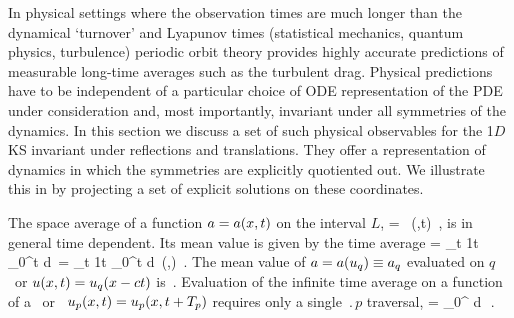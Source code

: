 


In physical settings where the observation times are much longer
than the dynamical `turnover' and Lyapunov times (statistical mechanics,
quantum physics, turbulence)
periodic orbit theory
provides highly accurate predictions of measurable
long-time averages such as the turbulent drag.
Physical predictions have to be independent of a
particular choice of ODE representation of
the PDE under consideration
and, most importantly,
invariant under all symmetries of the dynamics.
In this section we discuss
a set of such physical observables for
the  1$D$ KS invariant under reflections and translations.
They offer a representation of
dynamics in which the symmetries are explicitly quotiented out.
We illustrate  this in   by projecting
a set of explicit solutions on these coordinates.

The {space average} of a function $a = a(x,t)$  on
the interval $L$,
\beq
    \expct{\obser} = \Lint{\pSpace}\, \obser(\pSpace,t)
    \,,
    \label{rpo:spac_ave}
\eeq
is in general time dependent.
Its mean value is given by the {time average}
\beq
\timeAver{\obser}
    =
\lim_{t\rightarrow \infty} {1\over t} \int_0^t \! d\tau \, \expct{\obser}
    =
\lim_{t\rightarrow \infty} {1\over t} \int_0^t \!
    \Lint{\tau}  d\pSpace\, \obser(\pSpace,\tau)
    \,.
\label{rpo:tim_ave}
\eeq
The mean value
of $a = a(u_q) \equiv a_q$ evaluated on
$q$ \eqv\ or {\reqv} $u(x,t) = u_q(x-ct)$ is
\beq
\RLDedit{\timeAver{\obser}_\stagn = \expct{\obser}_\stagn = \obser_\stagn }
\,.
\label{rpo:u-eqv}
\eeq
Evaluation of the infinite time average 
on a function of a
\po\ or \rpo\ $u_p(x,t)=u_p(x,t+{T_{p}})$
 requires only a single $\period{p}$
traversal,
\beq
        = 
    \int_0^{} \! d\tau \, \expct{\obser}
\,.
\label{rpo:u-cyc}
\eeq

